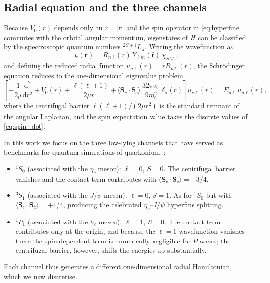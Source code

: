 \subsection{Radial equation and the three channels}
\label{ssec:channels}

Because $V_0(r)$ depends only on $r = |\mathbf{r}|$ and the spin operator in
\cref{eq:hyperfine} commutes with the orbital angular momentum, eigenstates
of $H$ can be classified by the spectroscopic quantum numbers
${}^{2S+1}L_J$. Writing the wavefunction as
\begin{equation}
  \label{eq:separation}
  \psi(\mathbf{r}) = R_{n\ell}(r)\,Y_{\ell m}(\hat{\mathbf{r}})\,\chi_{S M_S},
\end{equation}
and defining the reduced radial function $u_{n\ell}(r) = r R_{n\ell}(r)$, the
Schr\"{o}dinger equation reduces to the one-dimensional eigenvalue problem
\begin{equation}
  \label{eq:radial}
  \left[
    -\frac{1}{2\mu}\frac{\mathrm{d}^{2}}{\mathrm{d}r^{2}}
    + V_0(r)
    + \frac{\ell(\ell+1)}{2\mu r^{2}}
    + \langle\mathbf{S}_c\cdot\mathbf{S}_{\bar c}\rangle\,
      \frac{32\pi\alpha_s}{9 m_c^{2}}\,\delta_\sigma(r)
  \right] u_{n\ell}(r) = E_{n\ell}\,u_{n\ell}(r),
\end{equation}
where the centrifugal barrier $\ell(\ell+1)/(2\mu r^2)$ is the standard
remnant of the angular Laplacian, and the spin expectation value takes the
discrete values of \cref{eq:spin_dot}.

In this work we focus on the three low-lying channels that have served as
benchmarks for quantum simulations of quarkonium~\cite{woloshyn2023}:
\begin{itemize}
  \item ${}^1S_0$ (associated with the $\eta_c$ meson): $\ell=0$, $S=0$. The
    centrifugal barrier vanishes and the contact term contributes with
    $\langle\mathbf{S}_c\cdot\mathbf{S}_{\bar c}\rangle = -3/4$.
  \item ${}^3S_1$ (associated with the $J/\psi$ meson): $\ell=0$, $S=1$. As
    for ${}^1S_0$ but with $\langle\mathbf{S}_c\cdot\mathbf{S}_{\bar c}\rangle
    = +1/4$, producing the celebrated $\eta_c$--$J/\psi$ hyperfine splitting.
  \item ${}^1P_1$ (associated with the $h_c$ meson): $\ell=1$, $S=0$. The
    contact term contributes only at the origin, and because the
    $\ell=1$ wavefunction vanishes there the spin-dependent term is
    numerically negligible for $P$-waves; the centrifugal barrier, however,
    shifts the energies up substantially.
\end{itemize}
Each channel thus generates a different one-dimensional radial Hamiltonian,
which we now discretise.

